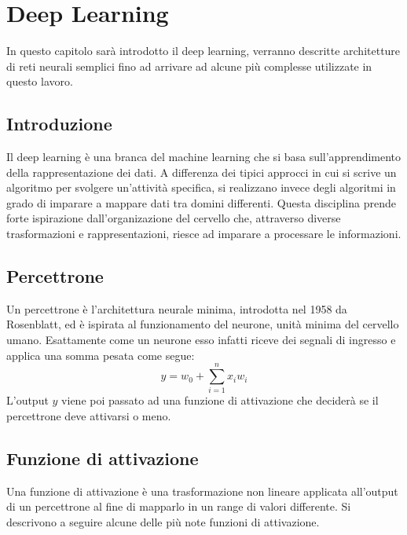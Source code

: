 \chapter{Deep Learning}
	\label{chap:deep-learning}
		In questo capitolo sarà introdotto il deep learning, verranno descritte architetture di reti neurali semplici fino ad arrivare ad alcune più complesse utilizzate in questo lavoro.
		
		\section{Introduzione}
		Il deep learning è una branca del machine learning che si basa sull'apprendimento della rappresentazione dei dati. A differenza dei tipici approcci in cui si scrive un algoritmo per svolgere un'attività specifica, si realizzano invece degli algoritmi in grado di imparare a mappare dati tra domini differenti.
		Questa disciplina prende forte ispirazione dall'organizazione del cervello che, attraverso diverse trasformazioni e rappresentazioni, riesce ad imparare a processare le informazioni.
		
		\section{Percettrone}
		Un percettrone è l'architettura neurale minima, introdotta nel 1958 da Rosenblatt\cite{perceptron}, ed è ispirata al funzionamento del neurone, unità minima del cervello umano. Esattamente come un neurone esso infatti riceve dei segnali di ingresso e applica una somma pesata come segue:
		\begin{equation}
			y = w_0 + \sum_{i=1}^n x_i w_i
		\end{equation}
		L'output $y$ viene poi passato ad una funzione di attivazione che deciderà se il percettrone deve attivarsi o meno.
		
		
		\section{Funzione di attivazione}
		Una funzione di attivazione è una trasformazione non lineare applicata all'output di un percettrone al fine di mapparlo in un range di valori differente.
		Si descrivono a seguire alcune delle più note funzioni di attivazione.
